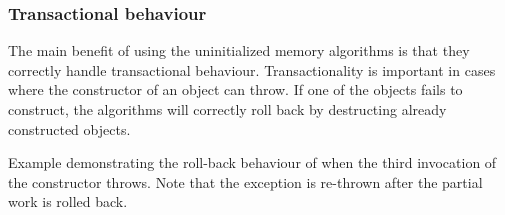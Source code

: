 \subsubsection{Transactional behaviour}

The main benefit of using the uninitialized memory algorithms is that they correctly handle transactional behaviour. Transactionality is important in cases where the constructor of an object can throw. If one of the objects fails to construct, the algorithms will correctly roll back by destructing already constructed objects.

\begin{box-note}
\footnotesize Example demonstrating the roll-back behaviour of  when the third invocation of the constructor throws. Note that the exception is re-thrown after the partial work is rolled back.
\tcblower
{}
\end{box-note}
